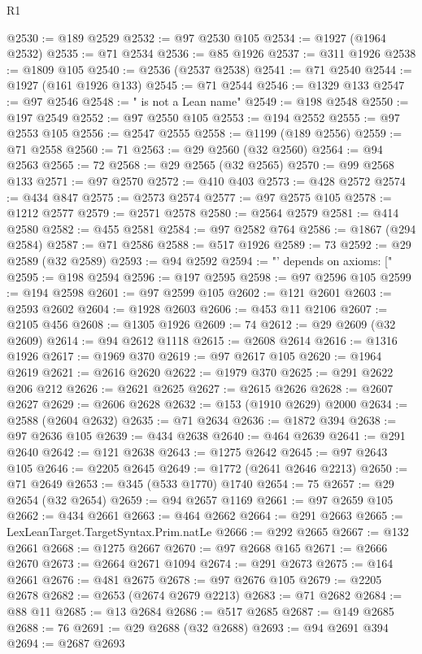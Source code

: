 \begin{lexlean}{R1}
\begin{coremodule}
@2530 := @189 @2529
@2532 := @97 @2530 @105
@2534 := @1927 (@1964 @2532)
@2535 := @71 @2534
@2536 := @85 @1926
@2537 := @311 @1926
@2538 := @1809 @105
@2540 := @2536 (@2537 @2538)
@2541 := @71 @2540
@2544 := @1927 (@161 @1926 @133)
@2545 := @71 @2544
@2546 := @1329 @133
@2547 := @97 @2546
@2548 := " is not a Lean name"
@2549 := @198 @2548
@2550 := @197 @2549
@2552 := @97 @2550 @105
@2553 := @194 @2552
@2555 := @97 @2553 @105
@2556 := @2547 @2555
@2558 := @1199 (@189 @2556)
@2559 := @71 @2558
@2560 := 71
@2563 := @29 @2560 (@32 @2560)
@2564 := @94 @2563
@2565 := 72
@2568 := @29 @2565 (@32 @2565)
@2570 := @99 @2568 @133
@2571 := @97 @2570
@2572 := @410 @403
@2573 := @428 @2572
@2574 := @434 @847
@2575 := @2573 @2574
@2577 := @97 @2575 @105
@2578 := @1212 @2577
@2579 := @2571 @2578
@2580 := @2564 @2579
@2581 := @414 @2580
@2582 := @455 @2581
@2584 := @97 @2582 @764
@2586 := @1867 (@294 @2584)
@2587 := @71 @2586
@2588 := @517 @1926
@2589 := 73
@2592 := @29 @2589 (@32 @2589)
@2593 := @94 @2592
@2594 := "' depends on axioms: ["
@2595 := @198 @2594
@2596 := @197 @2595
@2598 := @97 @2596 @105
@2599 := @194 @2598
@2601 := @97 @2599 @105
@2602 := @121 @2601
@2603 := @2593 @2602
@2604 := @1928 @2603
@2606 := @453 @11 @2106
@2607 := @2105 @456
@2608 := @1305 @1926
@2609 := 74
@2612 := @29 @2609 (@32 @2609)
@2614 := @94 @2612 @1118
@2615 := @2608 @2614
@2616 := @1316 @1926
@2617 := @1969 @370
@2619 := @97 @2617 @105
@2620 := @1964 @2619
@2621 := @2616 @2620
@2622 := @1979 @370
@2625 := @291 @2622 @206 @212
@2626 := @2621 @2625
@2627 := @2615 @2626
@2628 := @2607 @2627
@2629 := @2606 @2628
@2632 := @153 (@1910 @2629) @2000
@2634 := @2588 (@2604 @2632)
@2635 := @71 @2634
@2636 := @1872 @394
@2638 := @97 @2636 @105
@2639 := @434 @2638
@2640 := @464 @2639
@2641 := @291 @2640
@2642 := @121 @2638
@2643 := @1275 @2642
@2645 := @97 @2643 @105
@2646 := @2205 @2645
@2649 := @1772 (@2641 @2646 @2213)
@2650 := @71 @2649
@2653 := @345 (@533 @1770) @1740
@2654 := 75
@2657 := @29 @2654 (@32 @2654)
@2659 := @94 @2657 @1169
@2661 := @97 @2659 @105
@2662 := @434 @2661
@2663 := @464 @2662
@2664 := @291 @2663
@2665 := LexLeanTarget.TargetSyntax.Prim.natLe
@2666 := @292 @2665
@2667 := @132 @2661
@2668 := @1275 @2667
@2670 := @97 @2668 @165
@2671 := @2666 @2670
@2673 := @2664 @2671 @1094
@2674 := @291 @2673
@2675 := @164 @2661
@2676 := @481 @2675
@2678 := @97 @2676 @105
@2679 := @2205 @2678
@2682 := @2653 (@2674 @2679 @2213)
@2683 := @71 @2682
@2684 := @88 @11
@2685 := @13 @2684
@2686 := @517 @2685
@2687 := @149 @2685
@2688 := 76
@2691 := @29 @2688 (@32 @2688)
@2693 := @94 @2691 @394
@2694 := @2687 @2693

\end{coremodule}
\end{lexlean}
